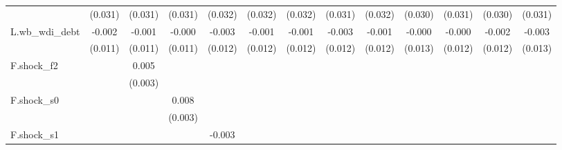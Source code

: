 {\begin{tabular}{l*{12}{c}}
            &     (0.031)         &     (0.031)         &     (0.031)         &     (0.032)         &     (0.032)         &     (0.032)         &     (0.031)         &     (0.032)         &     (0.030)         &     (0.031)         &     (0.030)         &     (0.031)         \\
\addlinespace
L.wb\_wdi\_debt&      -0.002         &      -0.001         &      -0.000         &      -0.003         &      -0.001         &      -0.001         &      -0.003         &      -0.001         &      -0.000         &      -0.000         &      -0.002         &      -0.003         \\
            &     (0.011)         &     (0.011)         &     (0.011)         &     (0.012)         &     (0.012)         &     (0.012)         &     (0.012)         &     (0.012)         &     (0.013)         &     (0.012)         &     (0.012)         &     (0.013)         \\
\addlinespace
F.shock\_f2  &                     &       0.005         &                     &                     &                     &                     &                     &                     &                     &                     &                     &                     \\
            &                     &     (0.003)         &                     &                     &                     &                     &                     &                     &                     &                     &                     &                     \\
\addlinespace
F.shock\_s0  &                     &                     &       0.008\sym{**} &                     &                     &                     &                     &                     &                     &                     &                     &                     \\
            &                     &                     &     (0.003)         &                     &                     &                     &                     &                     &                     &                     &                     &                     \\
\addlinespace
F.shock\_s1  &                     &                     &                     &      -0.003         &                     &                     &                     &                     &                     &                     &                     &                     \\

\end{tabular}}
